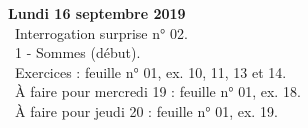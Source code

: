 \documentclass[12pt,a4paper]{article}
\begin{document}
% 
% 
% 
% 
%  
% 
% 
 \noindent\textbf{\bf Lundi 16 septembre 2019}\\ 
 \bu\ Interrogation surprise n° 02.\\
 \bu\ 1 - Sommes (début).\\
 \bu\ Exercices : feuille n° 01, ex. 10, 11, 13 et 14.\\
 \bu\ À faire pour mercredi 19 : feuille n° 01, ex. 18.\\
 \bu\ À faire pour jeudi 20 : feuille n° 01, ex. 19.\vspace{.4cm}\\
 
\end{document}
